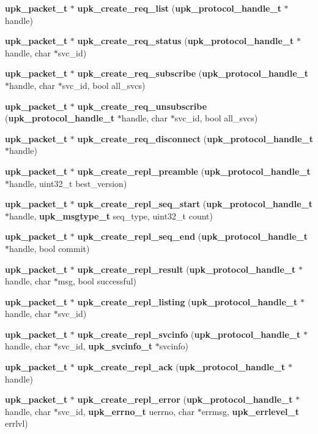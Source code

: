 \begin{DoxyCompactItemize}
{\bf upk\_\-packet\_\-t} $\ast$ {\bf upk\_\-create\_\-req\_\-list} ({\bf upk\_\-protocol\_\-handle\_\-t} $\ast$handle)
\item 
{\bf upk\_\-packet\_\-t} $\ast$ {\bf upk\_\-create\_\-req\_\-status} ({\bf upk\_\-protocol\_\-handle\_\-t} $\ast$handle, char $\ast$svc\_\-id)
\item 
{\bf upk\_\-packet\_\-t} $\ast$ {\bf upk\_\-create\_\-req\_\-subscribe} ({\bf upk\_\-protocol\_\-handle\_\-t} $\ast$handle, char $\ast$svc\_\-id, bool all\_\-svcs)
\item 
{\bf upk\_\-packet\_\-t} $\ast$ {\bf upk\_\-create\_\-req\_\-unsubscribe} ({\bf upk\_\-protocol\_\-handle\_\-t} $\ast$handle, char $\ast$svc\_\-id, bool all\_\-svcs)
\item 
{\bf upk\_\-packet\_\-t} $\ast$ {\bf upk\_\-create\_\-req\_\-disconnect} ({\bf upk\_\-protocol\_\-handle\_\-t} $\ast$handle)
\item 
{\bf upk\_\-packet\_\-t} $\ast$ {\bf upk\_\-create\_\-repl\_\-preamble} ({\bf upk\_\-protocol\_\-handle\_\-t} $\ast$handle, uint32\_\-t best\_\-version)
\item 
{\bf upk\_\-packet\_\-t} $\ast$ {\bf upk\_\-create\_\-repl\_\-seq\_\-start} ({\bf upk\_\-protocol\_\-handle\_\-t} $\ast$handle, {\bf upk\_\-msgtype\_\-t} seq\_\-type, uint32\_\-t count)
\item 
{\bf upk\_\-packet\_\-t} $\ast$ {\bf upk\_\-create\_\-repl\_\-seq\_\-end} ({\bf upk\_\-protocol\_\-handle\_\-t} $\ast$handle, bool commit)
\item 
{\bf upk\_\-packet\_\-t} $\ast$ {\bf upk\_\-create\_\-repl\_\-result} ({\bf upk\_\-protocol\_\-handle\_\-t} $\ast$handle, char $\ast$msg, bool successful)
\item 
{\bf upk\_\-packet\_\-t} $\ast$ {\bf upk\_\-create\_\-repl\_\-listing} ({\bf upk\_\-protocol\_\-handle\_\-t} $\ast$handle, char $\ast$svc\_\-id)
\item 
{\bf upk\_\-packet\_\-t} $\ast$ {\bf upk\_\-create\_\-repl\_\-svcinfo} ({\bf upk\_\-protocol\_\-handle\_\-t} $\ast$handle, char $\ast$svc\_\-id, {\bf upk\_\-svcinfo\_\-t} $\ast$svcinfo)
\item 
{\bf upk\_\-packet\_\-t} $\ast$ {\bf upk\_\-create\_\-repl\_\-ack} ({\bf upk\_\-protocol\_\-handle\_\-t} $\ast$handle)
\item 
{\bf upk\_\-packet\_\-t} $\ast$ {\bf upk\_\-create\_\-repl\_\-error} ({\bf upk\_\-protocol\_\-handle\_\-t} $\ast$handle, char $\ast$svc\_\-id, {\bf upk\_\-errno\_\-t} uerrno, char $\ast$errmsg, {\bf upk\_\-errlevel\_\-t} errlvl)
\item 

\end{DoxyCompactItemize}
